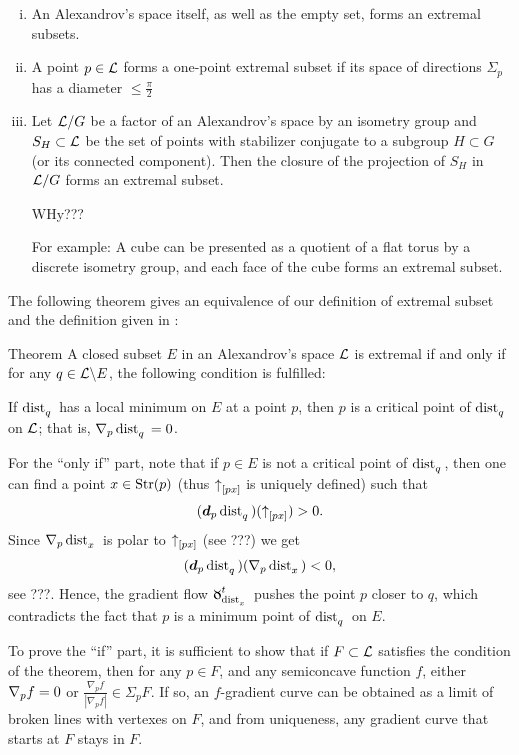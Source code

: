 \begin{enumerate}[(i)]
\item An Alexandrov's space itself, as well as the empty set, forms an extremal subsets.
\item A point $p\in \spc{L}$ forms a one-point extremal subset if its
space of directions $\Sigma_p$ has a diameter $\le\tfrac\pi2$

\item 
Let $\mathcal{L}/G$ be a factor of an Alexandrov's space by an isometry group and $S_H\subset \spc{L}$ be the set of points with stabilizer conjugate to a subgroup $H\subset G$ (or its connected component). 
Then the closure of the projection of $S_H$ in $\mathcal{L}/G$ forms an extremal subset.

WHy???

For example: A cube can be presented as a quotient of a flat torus by a discrete isometry group, and each face of the cube forms an extremal subset.

\end{enumerate}


\noi The following theorem gives an equivalence of our definition of extremal subset and the definition given in
\cite{perelman-petrunin:extremal}:

\begin{thm}{Theorem}\label{thm:dist-extr}  A closed subset $E$ in
an Alexandrov's space $\mathcal{L}$ is extremal if and only if for any $q\in \spc{L}\backslash E$,
the following condition is fulfilled:

If $\mathop{\rm dist}\nolimits_{q}^{{}}{}{}$ has a local minimum on $E$ at a point $p$, then $p$ is a critical
point of $\mathop{\rm dist}\nolimits_{q}^{{}}{}{}$ on $\mathcal{L}$; 
that is, $\nabla_p\mathop{\rm dist}\nolimits_{q}^{{}}{}{}=0$.
\end{thm}

 For the ``only if'' part, note that if $p\in E$ is not a critical point of
$\mathop{\rm dist}\nolimits_{q}^{{}}{}{}$, then one can find a point $x\in \Str(p)$ (thus ${\uparrow}_{[{p}{x}]}$ is
uniquely defined) such that 
\[(\bm{d}_p\mathop{\rm dist}\nolimits_{q}^{{}}{}{})({\uparrow}_{[{p}{x}]})>0.\] 
Since $\nabla_p\mathop{\rm dist}\nolimits_{x}^{{}}{}{}$ is polar to ${\uparrow}_{[{p}{x}]}$ (see
???) we get 
\[(\bm{d}_p\mathop{\rm dist}\nolimits_{q}^{{}}{}{})(\nabla_p\mathop{\rm dist}\nolimits_{x}^{{}}{}{})<0,\] 
see ???.
Hence, the gradient flow $\GF_{\distfun{x}{}{}}^t$ pushes the point $p$ closer to $q$, which
contradicts the fact that $p$ is a minimum point of $\mathop{\rm dist}\nolimits_{q}^{{}}{}{}$ on $E$.

To prove the ``if'' part, it is sufficient to show that if $F\subset \spc{L}$ satisfies the condition of the theorem,
then for any $p\in F$, and any semiconcave function $f$, either $\nabla_p f=0$ or 
$\tfrac{\nabla_p f}{|\nabla_p f|}\in \Sigma_p F$.
If so, an $f$-gradient curve
can be obtained as a limit of broken lines with vertexes on $F$, and from
uniqueness, any gradient curve that starts at $F$ stays in $F$.

